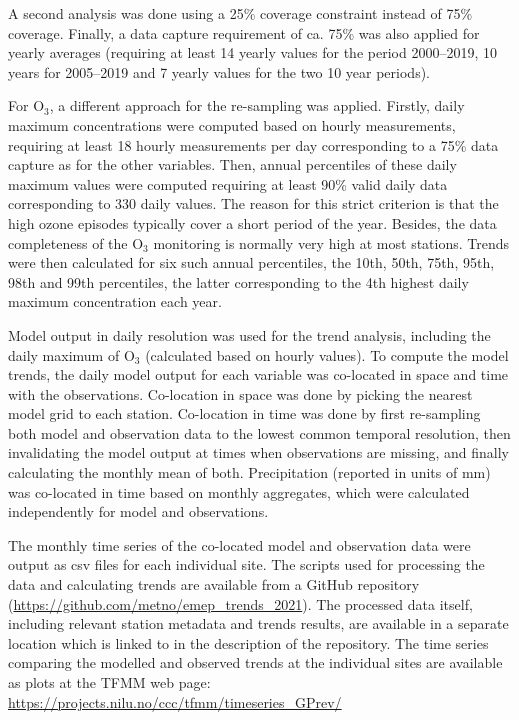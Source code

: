 A second analysis was done using a 25\% coverage constraint instead of 75\% coverage. Finally, a data capture requirement of ca. 75\% was also applied for yearly averages (requiring at least 14 yearly values for the period 2000--2019, 10 years for 2005--2019 and 7 yearly values for the two 10 year periods).

For O$_3$, a different approach for the re-sampling was applied. Firstly, daily maximum concentrations were computed based on hourly measurements, requiring at least 18 hourly measurements per day corresponding to a 75\% data capture as for the other variables. Then, annual percentiles of these daily maximum values were computed requiring at least 90\% valid daily data corresponding to 330 daily values. The reason for this strict criterion is that the high ozone episodes typically cover a short period of the year. Besides, the data completeness of the O$_3$ monitoring is normally very high at most stations. Trends were then calculated for six such annual percentiles, the 10th, 50th, 75th, 95th, 98th and 99th percentiles, the latter corresponding to the 4th highest daily maximum concentration each year. 

Model output in daily resolution was used for the trend analysis, including the daily maximum of O$_3$ (calculated based on hourly values). To compute the model trends, the daily model output for each variable was co-located in space and time with the observations. Co-location in space was done by picking the nearest model grid to each station. Co-location in time was done by first re-sampling both model and observation data to the lowest common temporal resolution, then invalidating the model output at times when observations are missing, and finally calculating the monthly mean of both. Precipitation (reported in units of mm) was co-located in time based on monthly aggregates, which were calculated independently for model and observations.

The monthly time series of the co-located model and observation data were output as csv files for each individual site. The scripts used for processing the data and calculating trends are available from a GitHub repository (\url{https://github.com/metno/emep_trends_2021}). The processed data itself, including relevant station metadata and trends results, are available in a separate location which is linked to in the description of the repository. The time series  comparing the modelled and observed trends at the individual sites are available as plots at the TFMM web page: \url{https://projects.nilu.no/ccc/tfmm/timeseries_GPrev/}

